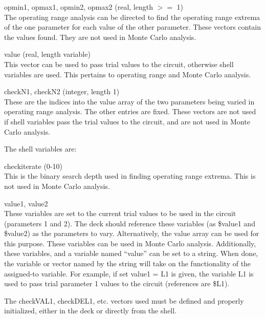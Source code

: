 \begin{description}
\item{{\et opmin1, opmax1, opmin2, opmax2} (real, length $>=$ 1)}\\
The operating range analysis can be directed to find the operating
range extrema of the one parameter for each value of the other
parameter.  These vectors contain the values found.  They are not used
in Monte Carlo analysis.

\item{{\et value} (real, length variable)}\\
This vector can be used to pass trial values to the circuit, otherwise
shell variables are used.  This pertains to operating range and Monte
Carlo analysis.

\item{{\et checkN1, checkN2} (integer, length 1)}\\
These are the indices into the value array of the two parameters being
varied in operating range analysis.  The other entries are fixed. 
These vectors are not used if shell variables pass the trial values to
the circuit, and are not used in Monte Carlo analysis.
\end{description}

The shell variables are:

\begin{description}
\item{{\et checkiterate} (0-10)}\\
This is the binary search depth used in finding operating range
extrema.  This is not used in Monte Carlo analysis.

\item{\et value1, value2}\\
These variables are set to the current trial values to be used in the
circuit (parameters 1 and 2).  The {\WRspice} deck should reference
these variables (as {\vt \$value1} and {\vt \$value2}) as the
parameters to vary.  Alternatively, the value array can be used for
this purpose.  These variables can be used in Monte Carlo analysis. 
Additionally, these variables, and a variable named ``{\vt value}''
can be set to a string.  When done, the variable or vector named by
the string will take on the functionality of the assigned-to variable. 
For example, if {\vt set value1 = L1} is given, the variable {\vt L1}
is used to pass trial parameter 1 values to the circuit (references
are {\vt \$L1}).
\end{description}

The {\et checkVAL1}, {\et checkDEL1}, etc.  vectors used must be
defined and properly initialized, either in the deck or directly from
the shell.

